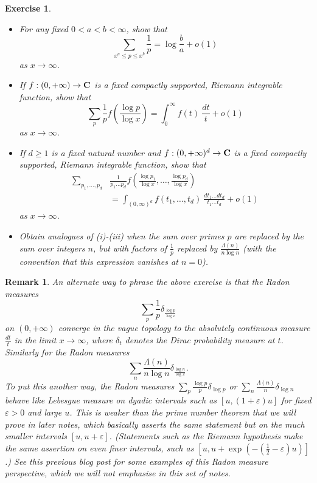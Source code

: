 \documentclass[10pt,reqno]{amsart}
\newtheorem{exercise}[theorem]{Exercise}
\newtheorem{remark}[theorem]{Remark}
\begin{document}
\begin{exercise}\
    \begin{itemize}
        \item[(i)] For any fixed $0 < a < b < \infty$, show that
        \[  \sum_{x^a \leq p \leq x^b} \frac{1}{p} = \log \frac{b}{a} + o(1)\]
        as $x \rightarrow \infty$.

        \item[(ii)] If $f: (0,+\infty) \rightarrow {\bf C}$ is a fixed compactly supported, Riemann integrable function, show that
        \[  \sum_p \frac{1}{p} f \left( \frac{\log p}{\log x} \right) = \int_0^\infty f(t)\ \frac{dt}{t} + o(1)\]
        as $x \rightarrow \infty$.

        \item[(iii)] If $d \geq 1$ is a fixed natural number and $f: (0,+\infty)^d \rightarrow {\bf C}$ is a fixed compactly supported, Riemann integrable function, show that
        \begin{align*} \sum_{p_1,\dots,p_d} &\frac{1}{p_1 \dots p_d} f \left( \frac{\log p_1}{\log x}, \dots, \frac{\log p_d}{\log x} \right)\\
        & = \int_{(0,\infty)^d} f(t_1,\dots,t_d)\ \frac{dt_1 \dots dt_d}{t_1 \dots t_d} + o(1)
        \end{align*}
        as $x \rightarrow \infty$.

        \item[(iv)] Obtain analogues of (i)-(iii) when the sum over primes $p$ are replaced by the sum over integers $n$, but with factors of $\frac{1}{p}$ replaced by $\frac{\Lambda(n)}{n \log n}$ (with the convention that this expression vanishes at $n=0$).
    \end{itemize}
\end{exercise}

\begin{remark}
    An alternate way to phrase the above exercise is that the \emph{Radon measures}
    \[  \sum_p \frac{1}{p} \delta_{\frac{\log p}{\log x}} \]
    on $(0,+\infty)$ converge in the \emph{vague topology} to the absolutely continuous measure $\frac{dt}{t}$ in the limit $x \rightarrow \infty$, where $\delta_t$ denotes the Dirac probability measure at $t$. Similarly for the Radon measures
    \[  \sum_n \frac{\Lambda(n)}{n\log n} \delta_{\frac{\log n}{\log x}}.\]
    To put this another way, the Radon measures $\sum_p \frac{\log p}{p} \delta_{\log p}$ or $\sum_n \frac{\Lambda(n)}{n} \delta_{\log n}$ behave like Lebesgue measure on dyadic intervals such as $[u, (1+\varepsilon) u]$ for fixed $\varepsilon > 0$ and large $u$. This is weaker than the \emph{prime number theorem} that we will prove in later notes, which basically asserts the same statement but on the much smaller intervals $[u, u+\varepsilon]$. (Statements such as the Riemann hypothesis make the same assertion on even finer intervals, such as $[u, u + \exp( - (\frac{1}{2}-\varepsilon) u) ]$.) See this \emph{previous blog post} for some examples of this Radon measure perspective, which we will not emphasise in this set of notes.
\end{remark}
\end{document}
